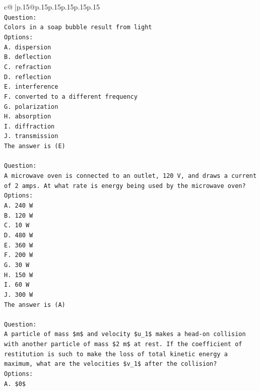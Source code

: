 \documentclass{article}
\begin{document}
{\begin{supertabular}{c@{$\;$}|p{.15\linewidth}@{}p{.15\linewidth}p{.15\linewidth}p{.15\linewidth}p{.15\linewidth}p{.15\linewidth}}
{{{\\ 
\texttt{Question:} \\
\texttt{Colors in a soap bubble result from light} \\
\texttt{Options:} \\
\texttt{A. dispersion} \\
\texttt{B. deflection} \\
\texttt{C. refraction} \\
\texttt{D. reflection} \\
\texttt{E. interference} \\
\texttt{F. converted to a different frequency} \\
\texttt{G. polarization} \\
\texttt{H. absorption} \\
\texttt{I. diffraction} \\
\texttt{J. transmission} \\
\texttt{The answer is (E)} \\
\\ 
\texttt{Question:} \\
\texttt{A microwave oven is connected to an outlet, 120 V, and draws a current of 2 amps. At what rate is energy being used by the microwave oven?} \\
\texttt{Options:} \\
\texttt{A. 240 W} \\
\texttt{B. 120 W} \\
\texttt{C. 10 W} \\
\texttt{D. 480 W} \\
\texttt{E. 360 W} \\
\texttt{F. 200 W} \\
\texttt{G. 30 W} \\
\texttt{H. 150 W} \\
\texttt{I. 60 W} \\
\texttt{J. 300 W} \\
\texttt{The answer is (A)} \\
\\ 
\texttt{Question:} \\
\texttt{A particle of mass \$m\$ and velocity \$u\_1\$ makes a head{-}on collision with another particle of mass \$2 m\$ at rest. If the coefficient of restitution is such to make the loss of total kinetic energy a maximum, what are the velocities \$v\_1\$ after the collision?} \\
\texttt{Options:} \\
\texttt{A. \$0\$} \\
}}}
\end{supertabular}}
\end{document}
